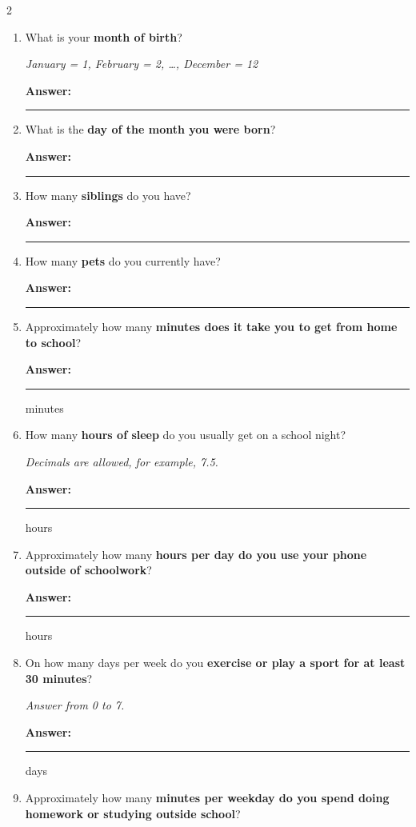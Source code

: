 	\begin{multicols}{2}
	\begin{enumerate}
		
		\item What is your \textbf{month of birth}?
		
		\textit{January = 1, February = 2, \ldots, December = 12}
		
		\textbf{Answer:} \rule{3cm}{0.4pt}
		
		\item What is the \textbf{day of the month you were born}?
		
		\textbf{Answer:} \rule{3cm}{0.4pt}
		
		\item How many \textbf{siblings} do you have?
		
		\textbf{Answer:} \rule{3cm}{0.4pt}
		
		\item How many \textbf{pets} do you currently have?
		
		\textbf{Answer:} \rule{3cm}{0.4pt}
		
		\item Approximately how many \textbf{minutes does it take you to get from home to school}?
		
		\textbf{Answer:} \rule{3cm}{0.4pt} minutes
		
		\item How many \textbf{hours of sleep} do you usually get on a school night?
		
		\textit{Decimals are allowed, for example, 7.5.}
		
		\textbf{Answer:} \rule{3cm}{0.4pt} hours
		
		\item Approximately how many \textbf{hours per day do you use your phone outside of schoolwork}?
		
		\textbf{Answer:} \rule{3cm}{0.4pt} hours
		
		\item On how many days per week do you \textbf{exercise or play a sport for at least 30 minutes}?
		
		\textit{Answer from 0 to 7.}
		
		\textbf{Answer:} \rule{3cm}{0.4pt} days
		
		\item Approximately how many \textbf{minutes per weekday do you spend doing homework or studying outside school}?
		

\end{enumerate}
\end{multicols}
